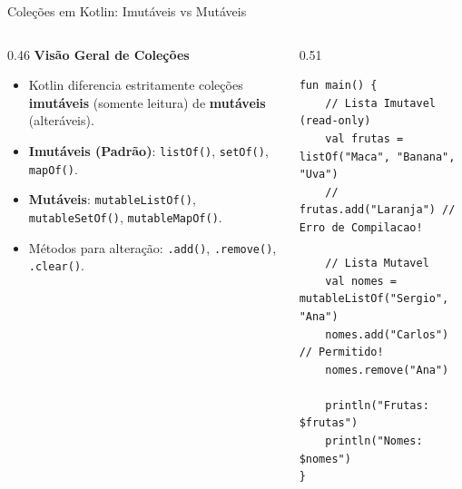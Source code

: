 \documentclass[aspectratio=169]{beamer}
\begin{document}
\begin{frame}[fragile]{Coleções em Kotlin: Imutáveis vs Mutáveis}
  \begin{columns}[T]
    \begin{column}{0.46\textwidth}
      \textbf{Visão Geral de Coleções}
      \vspace{0.3em}
      \begin{itemize}\small
        \item Kotlin diferencia estritamente coleções \textbf{imutáveis} (somente leitura) de \textbf{mutáveis} (alteráveis).
        \item \textbf{Imutáveis (Padrão)}: \texttt{listOf()}, \texttt{setOf()}, \texttt{mapOf()}.
        \item \textbf{Mutáveis}: \texttt{mutableListOf()}, \texttt{mutableSetOf()}, \texttt{mutableMapOf()}.
        \item Métodos para alteração: \texttt{.add()}, \texttt{.remove()}, \texttt{.clear()}.
      \end{itemize}
    \end{column}
    \begin{column}{0.51\textwidth}
\begin{lstlisting}[style=KotlinStyle]
fun main() {
    // Lista Imutavel (read-only)
    val frutas = listOf("Maca", "Banana", "Uva")
    // frutas.add("Laranja") // Erro de Compilacao!

    // Lista Mutavel
    val nomes = mutableListOf("Sergio", "Ana")
    nomes.add("Carlos") // Permitido!
    nomes.remove("Ana")

    println("Frutas: $frutas")
    println("Nomes: $nomes")
}
\end{lstlisting}
    \end{column}
  \end{columns}
\end{frame}
\end{document}
